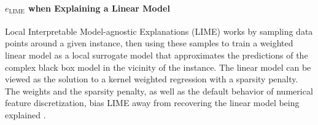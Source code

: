 \documentclass[12pt]{article}  %
\begin{document}
    \vspace{-3mm}
    \paragraph{$e_{\text{LIME}}$ when Explaining a Linear Model}
      \label{sec:lime_linear_case}
       Local Interpretable Model-agnostic Explanations (LIME) works by sampling data points around a given instance, then using these samples to train a weighted linear model as a local surrogate model that approximates the predictions of the complex black box model in the vicinity of the instance. The linear model can be viewed as the solution to a kernel weighted regression with a sparsity penalty. The weights and the sparsity penalty, as well as the default behavior of numerical feature discretization, bias LIME away from recovering the linear model being explained \citep{han22which}.
       
       
\end{document}
